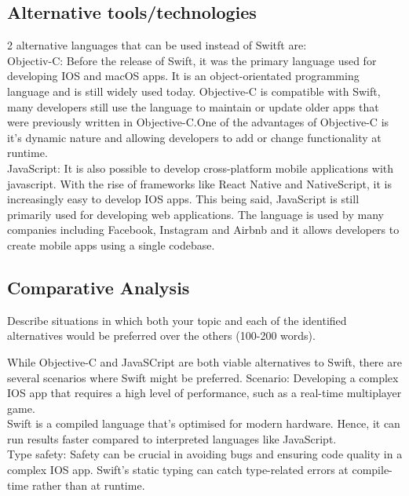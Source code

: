 \documentclass[a4paper, 11pt]{report}
\begin{document}
\subsection{Alternative tools/technologies}
2 alternative languages that can be used instead of Switft are:\\

Objectiv-C: Before the release of Swift, it was the primary language used for developing IOS and macOS apps. It is an object-orientated programming language and is still widely used today. Objective-C is compatible with Swift, many developers still use the language to maintain or update older apps that were previously written in Objective-C.One of the advantages of Objective-C is it’s dynamic nature and allowing developers to add or change functionality at runtime.\\

JavaScript: It is also possible to develop cross-platform mobile applications with javascript. With the rise of frameworks like React Native and NativeScript, it is increasingly easy to develop IOS apps. This being said, JavaScript is still primarily used for developing web applications. The language is used by many companies including Facebook, Instagram and Airbnb and it allows developers to create mobile apps using a single codebase.\\

\subsection{Comparative Analysis}
Describe situations in which both your topic and each of the identified alternatives would be preferred over the others (100-200 words).


While Objective-C and JavaSCript are both viable alternatives to Swift, there are several scenarios where Swift might be preferred. Scenario: Developing a complex IOS app that requires a high level of performance, such as a real-time multiplayer game.\\
Swift is a compiled language that’s optimised for modern hardware. Hence, it can run results faster compared to interpreted languages like JavaScript.\\
Type safety: Safety can be crucial in avoiding bugs and ensuring code quality in a complex IOS app. Swift’s static typing can catch type-related errors at compile-time rather than at runtime.\\
\\
\end{document}
